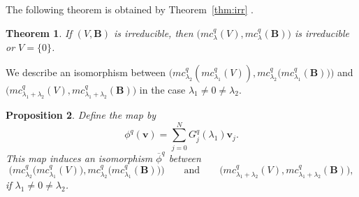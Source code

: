 \documentclass[pdftex]{sigma}
\numberwithin{equation}{section}
\newtheorem{Theorem}{Theorem}[section]
\newtheorem{Proposition}[Theorem]{Proposition}
\theoremstyle{definition}
\begin{document}
The following theorem is obtained by Theorem~\ref{thm:irr} \cite[Corollary~3.6]{DR1}.
\begin{Theorem}
If $(V,\boldsymbol{B})$ is irreducible, then $\bigl(mc ^{q}_{\lambda }(V), mc ^{q}_{\lambda } (\boldsymbol{B} )\bigr)$ is irreducible or $V=\{ 0 \}$.
\end{Theorem}
We describe an isomorphism between $\bigl(mc _{\lambda _2} ^{q} (mc _{\lambda _1} ^{q} (V)), mc _{\lambda _2} ^{q} \bigl(mc _{\lambda _1} ^{q} (\boldsymbol{B} )\bigr)\bigr)$ and $\bigl(mc _{\lambda _1 +\lambda _2} ^{q} (V),\allowbreak mc _{\lambda _1 +\lambda _2} ^{q} (\boldsymbol{B} )\bigr)$ in the case $\lambda _1 \neq 0 \neq \lambda _2$.
\begin{Proposition}
Define the map  by
\begin{equation*}
\phi ^{q} (\mathbf{v}) = \sum _{j=0}^N G_j^{q} (\lambda _1) \mathbf{v}_{j}.  %
\end{equation*}
This map induces an isomorphism $\overline{\phi }^{q} $ between
\[
\bigl(mc _{\lambda _2} ^{q} \bigl(mc _{\lambda _1} ^{q} (V)\bigr), mc _{\lambda _2} ^{q} \bigl(mc _{\lambda _1} ^{q} (\boldsymbol{B} )\bigr)\bigr)\qquad \text{and} \qquad\bigl(mc _{\lambda _1 +\lambda _2} ^{q} (V),
mc _{\lambda _1 +\lambda _2} ^{q} (\boldsymbol{B} )\bigr),
\]
 if $\lambda _1 \neq 0 \neq \lambda _2$.
\end{Proposition}
\end{document}

